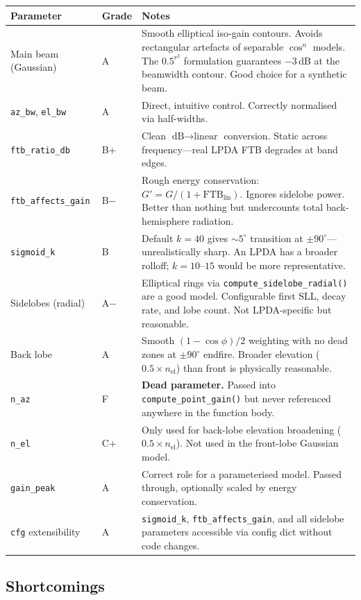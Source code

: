 \documentclass[11pt,a4paper]{article}
\begin{document}
\begin{longtable}{@{}llp{6cm}@{}}
\toprule
\textbf{Parameter} & \textbf{Grade} & \textbf{Notes} \\
\midrule
\endhead
Main beam (Gaussian) & A & Smooth elliptical iso-gain contours. Avoids rectangular artefacts of separable $\cos^n$ models. The $0.5^{r^2}$ formulation guarantees $-3$\,dB at the beamwidth contour. Good choice for a synthetic beam. \\
\texttt{az\_bw}, \texttt{el\_bw} & A & Direct, intuitive control. Correctly normalised via half-widths. \\
\texttt{ftb\_ratio\_db} & B+ & Clean $\text{dB} \to \text{linear}$ conversion. Static across frequency---real LPDA FTB degrades at band edges. \\
\texttt{ftb\_affects\_gain} & B$-$ & Rough energy conservation: $G' = G / (1 + \text{FTB}_\text{lin})$. Ignores sidelobe power. Better than nothing but undercounts total back-hemisphere radiation. \\
\texttt{sigmoid\_k} & B & Default $k = 40$ gives $\sim\!5^\circ$ transition at $\pm 90^\circ$---unrealistically sharp. An LPDA has a broader rolloff; $k = 10$--$15$ would be more representative. \\
Sidelobes (radial) & A$-$ & Elliptical rings via \texttt{compute\_sidelobe\_radial()} are a good model. Configurable first SLL, decay rate, and lobe count. Not LPDA-specific but reasonable. \\
Back lobe & A & Smooth $(1 - \cos\phi)/2$ weighting with no dead zones at $\pm 90^\circ$ endfire. Broader elevation ($0.5 \times n_\text{el}$) than front is physically reasonable. \\
\texttt{n\_az} & F & \textbf{Dead parameter.} Passed into \texttt{compute\_point\_gain()} but never referenced anywhere in the function body. \\
\texttt{n\_el} & C+ & Only used for back-lobe elevation broadening ($0.5 \times n_\text{el}$). Not used in the front-lobe Gaussian model. \\
\texttt{gain\_peak} & A & Correct role for a parameterised model. Passed through, optionally scaled by energy conservation. \\
\texttt{cfg} extensibility & A & \texttt{sigmoid\_k}, \texttt{ftb\_affects\_gain}, and all sidelobe parameters accessible via config dict without code changes. \\
\bottomrule
\end{longtable}

\subsection{Shortcomings}
\end{document}
